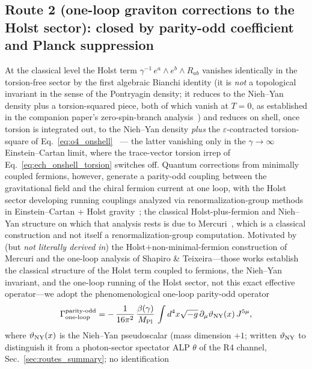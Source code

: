 \documentclass[aps,prd,twocolumn,superscriptaddress,showpacs,preprintnumbers,nofootinbib,longbibliography,floatfix]{revtex4-2}
\begin{document}
\subsection{Route 2 (one-loop graviton corrections to the Holst sector):
closed by parity-odd coefficient and Planck suppression}
\label{sec:r2_oneloop}
At the classical level the Holst term $\gamma^{-1}\,e^a\!\wedge e^b\wedge
R_{ab}$ vanishes identically in the torsion-free sector by the first
algebraic Bianchi identity (it is \emph{not} a topological invariant in the
sense of the Pontryagin density; it reduces to the Nieh--Yan density plus a
torsion-squared piece, both of which vanish at $T=0$, as established in the
companion paper's zero-spin-branch analysis~\cite{Golden2026P1a}) and reduces
on shell, once torsion is integrated out, to the Nieh--Yan density
\emph{plus} the $\varepsilon$-contracted torsion-square of
Eq.~\eqref{eq:o4_onshell}~\cite{Holst1996,Freidel2005} --- the latter
vanishing only in the $\gamma\to\infty$ Einstein--Cartan limit, where the
trace-vector torsion irrep of
Eq.~\eqref{eq:ech_onshell_torsion} switches off. Quantum
corrections from minimally coupled fermions, however, generate a
parity-odd coupling between the gravitational field and the chiral
fermion current at one loop, with the Holst sector developing
running couplings analyzed via renormalization-group methods in
Einstein--Cartan + Holst gravity~\cite{ShapiroTeixeira2014}; the
classical Holst-plus-fermion and Nieh--Yan structure on which that
analysis rests is due to Mercuri~\cite{Mercuri2009}, which is a classical
construction and not itself a renormalization-group
computation. Motivated by (but \emph{not literally
derived in}) the Holst$+$non-minimal-fermion construction of
Mercuri and the one-loop analysis of Shapiro \& Teixeira---those
works establish the classical structure of the Holst term coupled
to fermions, the Nieh--Yan invariant, and the one-loop running of
the Holst sector, not this exact effective operator---we adopt
the phenomenological one-loop parity-odd operator
\begin{equation}
\Gamma_{\rm one\text{-}loop}^{\rm parity\text{-}odd}
= -\,\frac{1}{16\pi^2}\,
\frac{\beta(\gamma)}{M_{\rm Pl}}\,
\int d^4x\sqrt{-g}\,
\partial_\mu\vartheta_{\rm NY}(x)\,J^{5\mu},
\label{eq:oneloop_parity_odd}
\end{equation}
where $\vartheta_{\rm NY}(x)$ is the Nieh--Yan pseudoscalar (mass dimension $+1$; written
$\vartheta_{\rm NY}$ to distinguish it from a photon-sector spectator
ALP $\theta$ of the R4 channel, Sec.~\ref{sec:routes_summary}; no identification
\end{document}
